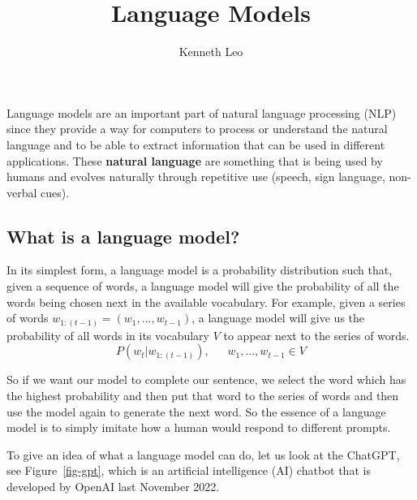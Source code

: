 \documentclass[
  letterpaper,
  DIV=11,
  numbers=noendperiod]{scrartcl}
\title{Language Models}
\author{Kenneth Leo}
\date{}
\begin{document}
\maketitle
\ifdefined\Shaded\renewenvironment{Shaded}{\begin{tcolorbox}[enhanced, sharp corners, borderline west={3pt}{0pt}{shadecolor}, frame hidden, breakable, interior hidden, boxrule=0pt]}{\end{tcolorbox}}\fi

Language models are an important part of natural language processing
(NLP) since they provide a way for computers to process or understand
the natural language and to be able to extract information that can be
used in different applications. These \textbf{natural language} are
something that is being used by humans and evolves naturally through
repetitive use (speech, sign language, non-verbal cues).

\hypertarget{what-is-a-language-model}{%
\subsection{What is a language model?}\label{what-is-a-language-model}}

In its simplest form, a language model is a probability distribution
such that, given a sequence of words, a language model will give the
probability of all the words being chosen next in the available
vocabulary. For example, given a series of words
\(w_{1:(t-1)} = (w_1,...,w_{t-1})\), a language model will give us the
probability of all words in its vocabulary \(V\) to appear next to the
series of words. \[
P(w_t | w_{1:(t-1)}), \ \ \ \ \ \ \ w_1,...,w_{t-1}\in V
\]

So if we want our model to complete our sentence, we select the word
which has the highest probability and then put that word to the series
of words and then use the model again to generate the next word. So the
essence of a language model is to simply imitate how a human would
respond to different prompts.

To give an idea of what a language model can do, let us look at the
ChatGPT, see Figure~\ref{fig-gpt}, which is an artificial intelligence
(AI) chatbot that is developed by OpenAI last November 2022.
\end{document}
